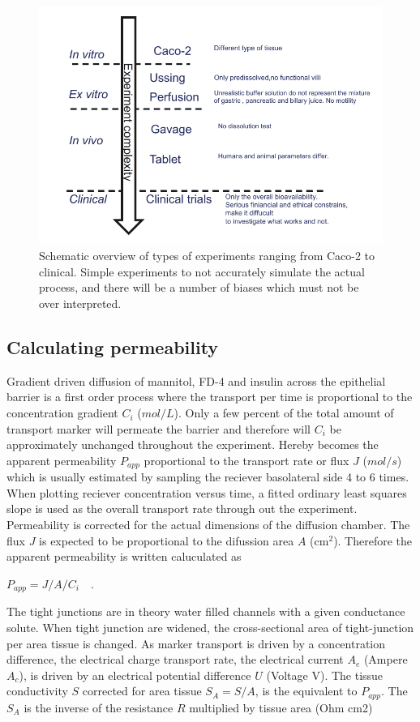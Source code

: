 \begin{figure}[h]
\label{devel_typeOf}
\includegraphics{graphics/typeOfExperiments.pdf}
\caption{Schematic overview of types of experiments ranging from Caco-2 to clinical. Simple experiments to not accurately simulate the actual process, and there will be a number of biases which must not be over interpreted.}
\end{figure}


\subsection{Calculating permeability}
Gradient driven diffusion of mannitol, FD-4 and insulin across the epithelial barrier is a first order process where the transport per time is proportional to the concentration gradient $C_i$ ($mol/L$). Only a few percent of the total amount of transport marker will permeate the barrier and therefore will $C_i$ be approximately unchanged throughout the experiment. Hereby becomes the apparent permeability $P_{app}$ proportional to the transport rate or flux $J$ ($mol/s$) which is usually estimated by sampling the reciever basolateral side 4 to 6 times. When plotting reciever concentration versus time, a fitted ordinary least squares slope is used as the overall transport rate through out the experiment. Permeability is corrected for the actual dimensions of the diffusion chamber. The flux $J$ is expected to be proportional to the difussion area $A$ (cm$^2$).  Therefore the apparent permeability is written caluculated as

$P_{app} = J/A / C_i \quad .$

The tight junctions are in theory water filled channels with a given conductance solute. When tight junction are widened, the cross-sectional area of tight-junction per area tissue is changed. As marker transport is driven by a concentration difference, the electrical charge transport rate, the electrical current $A_{e}$ (Ampere $A_c$), is driven by an electrical potential difference $U$ (Voltage V). The tissue conductivity $S$ corrected for area tissue $S_A = S/A$, is the equivalent to $P_{app}$. The $S_A$ is the inverse of the resistance $R$ multiplied by tissue area (Ohm cm2)

